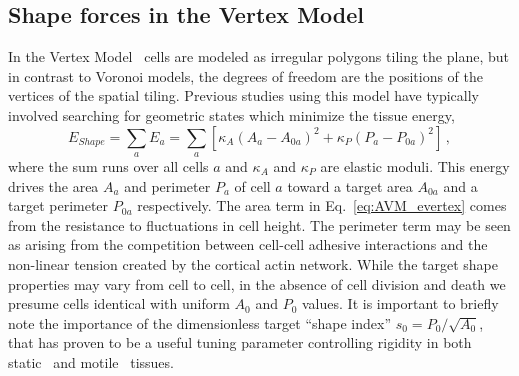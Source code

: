 \documentclass[
reprint
,aps
,amssymb
,amsmath
,superscriptaddress
]{revtex4-1}
\begin{document}
\subsection{Shape forces in the Vertex Model}
In the Vertex Model~\cite{Farhadifar2007, Staple2010, Hufnagel2007, Bi2014} cells are modeled as irregular polygons tiling the plane, but in contrast to Voronoi models, the degrees of freedom are the positions of the vertices of the spatial tiling. Previous studies using this model have typically involved searching for geometric states which minimize the tissue energy,
%
\begin{equation}\label{eq:AVM_evertex}
E_{Shape} = \sum_{a} E_a = \sum_{a} \left[ \kappa_{A}\left(A_a-A_{0a}\right)^2+\kappa_{P}\left(P_{a}-P_{0a}\right)^2 \right] \, ,
\end{equation}
%
where the sum runs over all cells $a$ and $\kappa_A$ and $\kappa_P$ are elastic moduli. This energy drives the area $A_a$ and perimeter $P_a$ of cell $a$ toward a target area $A_{0a}$ and a target perimeter $P_{0a}$ respectively. The area term in Eq.~\ref{eq:AVM_evertex} comes from the resistance to fluctuations in cell height. The perimeter term may be seen as arising from the competition between cell-cell adhesive interactions and the non-linear tension created by the cortical actin network. While the target shape properties may vary from cell to cell, in the absence of cell division and death we presume cells identical with uniform $A_0$ and $P_0$ values. It is important to briefly note the importance of the dimensionless target ``shape index'' $s_0 = P_0 / \sqrt{A_0}$, that has proven to be a useful tuning parameter controlling rigidity in both static~\cite{Bi2015} and motile~\cite{Bi2016} tissues.

\end{document}
